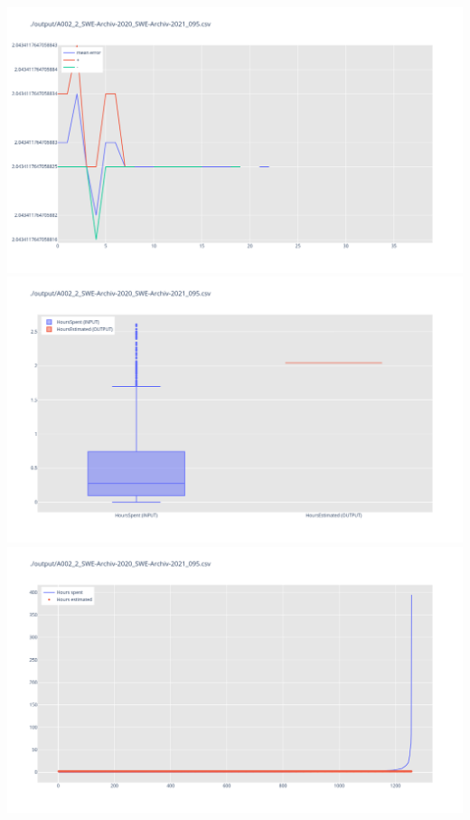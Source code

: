 \includegraphics[width=\textwidth]{Scripts/output/A002_2_SWE-Archiv-2020_SWE-Archiv-2021_095.csv.error_distribution.png}
\includegraphics[width=\textwidth]{Scripts/output/A002_2_SWE-Archiv-2020_SWE-Archiv-2021_095.csv.png}
\includegraphics[width=\textwidth]{Scripts/output/A002_2_SWE-Archiv-2020_SWE-Archiv-2021_095.csv.scatter.png}
